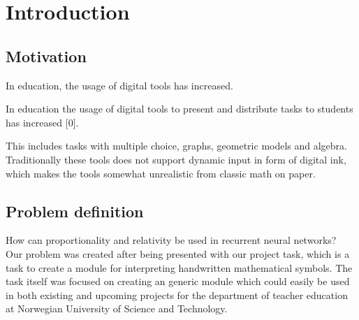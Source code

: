 \chapter{Introduction}

\section{Motivation} %

In education, the usage of digital tools has increased. 




In education the usage of digital tools to present and distribute tasks to students has increased [0]. %

This includes tasks with multiple choice, graphs, geometric models and algebra. Traditionally these tools does not support dynamic input in form of digital ink, which makes the tools somewhat unrealistic from classic math on paper.

\section{Problem definition} %
How can proportionality and relativity be used in recurrent neural networks? \\ Our problem was created after being presented with our project task, which is a task to create a module for interpreting handwritten mathematical symbols. The task itself was focused on creating an generic module which could easily be used in both existing and upcoming projects for the department of teacher education at Norwegian University of Science and Technology.


